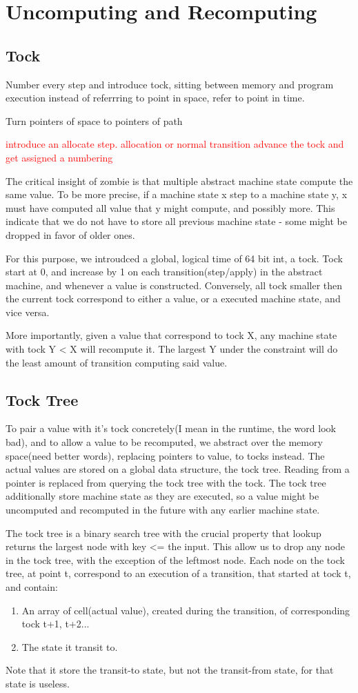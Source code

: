 \documentclass[acmsmall]{acmart}
\newcommand\todo[1]{\textcolor{red}{#1}}
\begin{document}
	\section{Uncomputing and Recomputing}
	\subsection{Tock}
	Number every step and introduce tock, sitting between memory and program execution
	instead of referrring to point in space, refer to point in time.

	Turn pointers of space to pointers of path
	
	\todo{introduce an allocate step. allocation or normal transition advance the tock and get assigned a numbering}
	
	The critical insight of zombie is that multiple abstract machine state compute the same value. To be more precise, if a machine state x step to a machine state y, x must have computed all value that y might compute, and possibly more. This indicate that we do not have to store all previous machine state - some might be dropped in favor of older ones.
	
	For this purpose, we introudced a global, logical time of 64 bit int, a tock. Tock start at 0, and increase by 1 on each transition(step/apply) in the abstract machine, and whenever a value is constructed. Conversely, all tock smaller then the current tock correspond to either a value, or a executed machine state, and vice versa.
	
	More importantly, given a value that correspond to tock X, any machine state with tock Y < X will recompute it. The largest Y under the constraint will do the least amount of transition computing said value.
	\subsection{Tock Tree}
	To pair a value with it's tock concretely(I mean in the runtime, the word look bad), and to allow a value to be recomputed, we abstract over the memory space(need better words), replacing pointers to value, to tocks instead. The actual values are stored on a global data structure, the tock tree. Reading from a pointer is replaced from querying the tock tree with the tock. The tock tree additionally store machine state as they are executed, so a value might be uncomputed and recomputed in the future with any earlier machine state.
	
	The tock tree is a binary search tree with the crucial property that lookup returns the largest node with key <= the input. This allow us to drop any node in the tock tree, with the exception of the leftmost node. Each node on the tock tree, at point t, correspond to an execution of a transition, that started at tock t, and contain:
	\begin{enumerate}
		\item An array of cell(actual value), created during the transition, of corresponding tock t+1, t+2...
		\item The state it transit to.
	\end{enumerate} 
	Note that it store the transit-to state, but not the transit-from state, for that state is useless.
\end{document}
